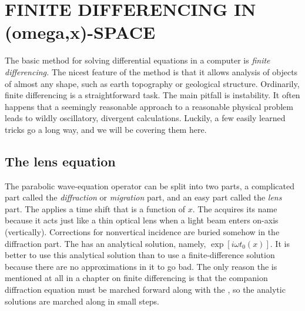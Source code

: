 \section{FINITE DIFFERENCING IN (omega,x)-SPACE}
\par
The basic method for solving differential equations in a computer
is 
{\em 
finite differencing.
}
The nicest feature of the method is that it allows analysis of 
objects of almost any shape, such as earth topography or geological structure.
Ordinarily, finite differencing is a straightforward task.
The main pitfall is instability. 
It often happens that a seemingly reasonable approach
to a reasonable physical problem
leads to wildly oscillatory, divergent calculations.
Luckily, a few easily learned tricks go a long way,
and we will be covering them here.

\subsection{The lens equation}
\par
The parabolic wave-equation operator
can be split into two parts,
a complicated part called the
{\em  diffraction}
or
{\em  migration}
part, and an easy part called the 
{\em  lens}
part.
The  applies a time shift that is a function of  $x$.
The  acquires its name because it acts just like
a thin optical lens when a light beam enters on-axis (vertically).
Corrections for nonvertical incidence
are buried somehow in the diffraction part.
The  has an analytical solution,
namely, $ \exp [ i \omega t_0 (x)]$.
It is better to use this analytical solution than to use a finite-difference
solution because there are no approximations in it to go bad.
The only reason the  is mentioned at all
in a chapter on finite differencing
is that the companion diffraction equation
must be marched forward along with the ,
so the analytic solutions are marched along in small steps.

